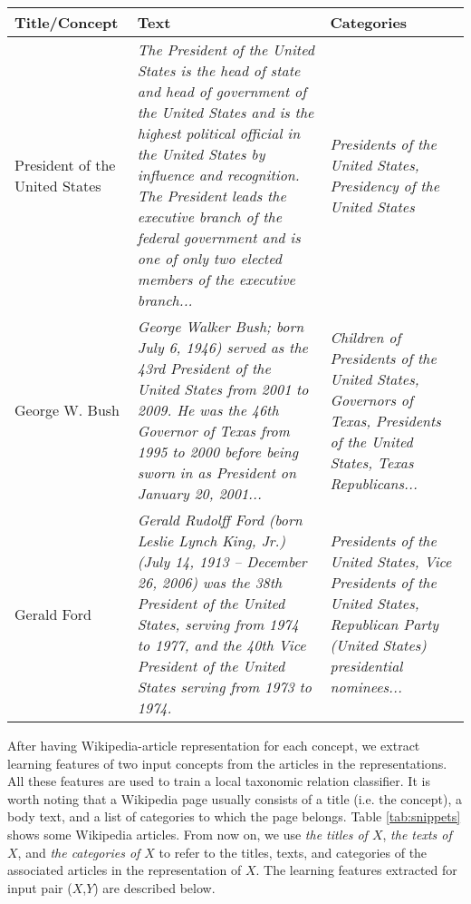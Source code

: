 \begin{table*}[!t]
  \tiny
  \centering
  \begin{tabular}{|p{0.5in}|p{3.7in}|p{1.6in}|}
    \hline
    {\bf Title/Concept} & {\bf Text} & {\bf Categories} \\
    \hline
    \hline
    President of the United States & \textit{The President of the United States is the head of state and head of government of the United States and is the highest political official in the United States by influence and recognition. The President leads the executive branch of the federal government and is one of only two elected members of the executive branch...} & \textit{Presidents of the United States, Presidency of the United States} \\
    \hline
    George W. Bush & \textit{George Walker Bush; born July 6, 1946) served as the 43rd President of the United States from 2001 to 2009. He was the 46th Governor of Texas from 1995 to 2000 before being sworn in as President on January 20, 2001...} & \textit{Children of Presidents of the United States, Governors of Texas, Presidents of the United States, Texas Republicans...} \\
    \hline
    Gerald Ford & \textit{Gerald Rudolff Ford (born Leslie Lynch King, Jr.) (July 14, 1913 – December 26, 2006) was the 38th President of the United States, serving from 1974 to 1977, and the 40th Vice President of the United States serving from 1973 to 1974.} & \textit{Presidents of the United States, Vice Presidents of the United States, Republican Party (United States) presidential nominees...} \\
    \hline
  \end{tabular}
  \caption{Examples of texts and categories of Wikipedia articles.}
  \label{tab:snippets}
\end{table*}

After having Wikipedia-article representation for each concept, we
extract learning features of two input concepts from the articles in
the representations. All these features are used to train a local
taxonomic relation classifier. It is worth noting that a Wikipedia
page usually consists of a title (i.e. the concept), a body text, and
a list of categories to which the page belongs. Table
\ref{tab:snippets} shows some Wikipedia articles. From now on, we use
{\em the titles of $X$}, {\em the texts of $X$}, and {\em the
  categories of $X$} to refer to the titles, texts, and categories of
the associated articles in the representation of $X$.  The learning
features extracted for input pair ($X$,$Y$) are described below.

